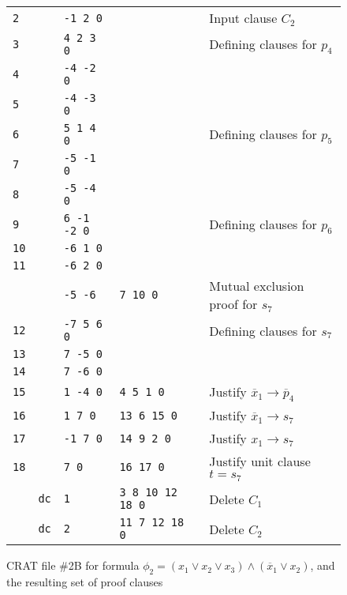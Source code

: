 \documentclass{llncs}
\newcommand{\obar}[1]{\overline{#1}}
\begin{document}
\begin{figure}
\begin{center}
\begin{tabular}{llllll}
    {\tt 2} &    & {\tt -1 2 0}  &            & & Input clause $C_2$ \\
    {\tt 3} &   & {\tt 4 2 3 0} &     & & Defining clauses for $p_4$ \\
    {\tt 4} &   & {\tt -4 -2 0} &     & & \\
    {\tt 5} &   & {\tt -4 -3 0} &     & & \\
    {\tt 6} &   & {\tt 5 1 4 0} &     & & Defining clauses for $p_5$ \\
    {\tt 7} &   & {\tt -5 -1 0} &     & & \\
    {\tt 8} &   & {\tt -5 -4 0} &     & & \\
    {\tt 9} &   & {\tt 6 -1 -2 0}&     & & Defining clauses for $p_6$ \\ 
    {\tt 10} &   & {\tt -6 1 0}    &  & & \\
    {\tt 11} &   & {\tt -6 2 0}    &  & & \\ 
     &           & {\tt -5 -6}   & {\tt 7 10 0}  & & Mutual exclusion proof for $s_7$ \\
    {\tt 12} &   & {\tt -7 5 6 0}  &     & & Defining clauses for $s_7$ \\ 
    {\tt 13} &   & {\tt  7 -5 0}    &  & & \\  
    {\tt 14} &   & {\tt  7 -6 0}    &  & & \\
    {\tt 15} &   & {\tt 1 -4 0}    & {\tt 4 5 1 0} & & Justify $\obar{x}_1 \rightarrow \obar{p}_4$ \\
    {\tt 16} &   & {\tt 1 7 0}     & {\tt 13 6 15 0} & & Justify $\obar{x}_1 \rightarrow s_7$ \\
    {\tt 17} &   & {\tt -1 7 0}    & {\tt 14 9 2 0} & & Justify $x_1 \rightarrow s_7$ \\
    {\tt 18} &   & {\tt 7 0}       & {\tt 16 17 0}  & & Justify unit clause $t = s_7$ \\
             & {\tt dc}  & {\tt 1}         & {\tt 3 8 10 12 18 0} & & Delete $C_1$\\
             & {\tt dc}  & {\tt 2}         & {\tt 11 7 12 18 0} & & Delete $C_2$\\
  \end{tabular}
  \end{center}  
  \caption{CRAT file \#2B for formula $\phi_2 = (x_1 \lor x_2 \lor x_3) \land (\obar{x}_1 \lor x_2)$, and the resulting set of proof clauses}
  \label{fig:p2-cdcl:crat}
\end{figure}
\end{document}
